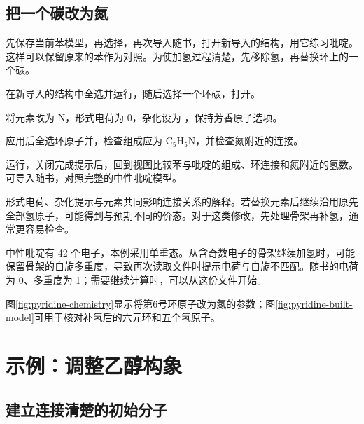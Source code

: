\subsection{把一个碳改为氮}

先保存当前苯模型，再选择，再次导入随书，打开新导入的结构，用它练习吡啶。这样可以保留原来的苯作为对照。为使加氢过程清楚，先移除氢，再替换环上的一个碳。

\begin{steps}
  \item 在新导入的结构中全选并运行，随后选择一个环碳，打开。
  \item 将元素改为 N，形式电荷为 0，杂化设为 ，保持芳香原子选项。
\end{steps}



\begin{steps}[resume]
  \item 应用后全选环原子并，检查组成应为 $\mathrm{C_5H_5N}$，并检查氮附近的连接。
  \item 运行，关闭完成提示后，回到视图比较苯与吡啶的组成、环连接和氮附近的氢数。可导入随书，对照完整的中性吡啶模型。
\end{steps}

形式电荷、杂化提示与元素共同影响连接关系的解释。若替换元素后继续沿用原先全部氢原子，可能得到与预期不同的价态。对于这类修改，先处理骨架再补氢，通常更容易检查。

中性吡啶有 42 个电子，本例采用单重态。从含奇数电子的骨架继续加氢时，可能保留骨架的自旋多重度，导致再次读取文件时提示电荷与自旋不匹配。随书的电荷为 0、多重度为 1；需要继续计算时，可以从这份文件开始。

图\ref{fig:pyridine-chemistry}显示将第6号环原子改为氮的参数；图\ref{fig:pyridine-built-model}可用于核对补氢后的六元环和五个氢原子。



\section{示例：调整乙醇构象}

\subsection{建立连接清楚的初始分子}


